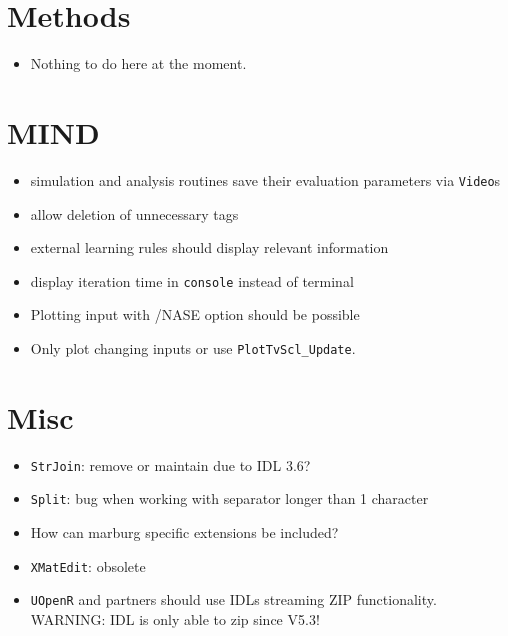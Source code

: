 \documentclass[12pt]{article}
\begin{document}
\section{Methods}
\begin{itemize}
\item Nothing to do here at the moment.
\end{itemize}


\section{MIND}
\begin{itemize}
\item simulation and analysis routines save their evaluation parameters via \texttt{Video}s
\item allow deletion of unnecessary tags
\item external learning rules should display relevant information
\item display iteration time in \texttt{console} instead of terminal
\item Plotting input with /NASE option should be possible
\item Only plot changing inputs or use \texttt{PlotTvScl_Update}.
\end{itemize}



\section{Misc}
\begin{itemize}
\item \texttt{StrJoin}: remove or maintain due to IDL 3.6?
\item \texttt{Split}: bug when working with separator longer than 1 character
\item How can marburg specific extensions be included?
\item \texttt{XMatEdit}: obsolete 
\item \texttt{UOpenR} and partners should use IDLs streaming ZIP functionality.
WARNING: IDL is only able to zip since V5.3!
\end{itemize}
\end{document}
